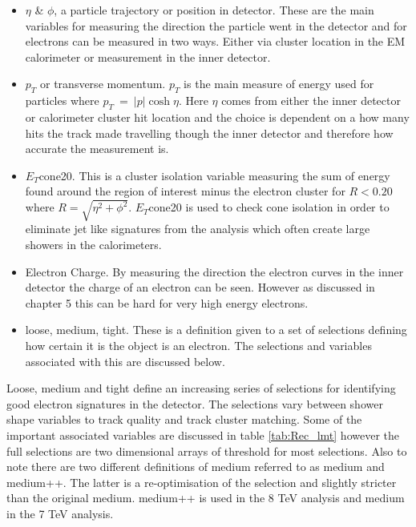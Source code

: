 	\begin{itemize}
	\item $\eta$ \& $\phi$, a particle trajectory or position in detector. These are the main variables for measuring the direction the particle went in the detector and for electrons can be measured in two ways. Either via cluster location in the EM calorimeter or measurement in the inner detector.
	\item $p_{T}$ or transverse momentum. $p_{T}$ is the main measure of energy used for particles where $p_{T}~=~|p|\cosh{\eta}$. Here $\eta$ comes from either the inner detector or calorimeter cluster hit location and the choice is dependent on a how many hits the track made travelling though the inner detector and therefore how accurate the measurement is.
	\item $E_{T}$cone20. This is a cluster isolation variable measuring the sum of energy found around the region of interest minus the electron cluster for $R < 0.20$ where $R = \sqrt{\eta^{2} + \phi^{2}}$. $E_{T}$cone20 is used to check cone isolation in order to eliminate jet like signatures from the analysis which often create large showers in the calorimeters.
	\item Electron Charge. By measuring the direction the electron curves in the inner detector the charge of an electron can be seen. However as discussed in chapter 5 this can be hard for very high energy electrons.
	\item loose, medium, tight. These is a definition given to a set of selections defining how certain it is the object is an electron. The selections and variables associated with this are discussed below.
	\end{itemize}

	Loose, medium and tight define an increasing series of selections for identifying good electron signatures in the detector. The selections vary between shower shape variables to track quality and track cluster matching. Some of the important associated variables are discussed in table \ref{tab:Rec_lmt} however the full selections are two dimensional arrays of threshold for most selections. Also to note there are two different definitions of medium referred to as medium and medium++. The latter is a re-optimisation of the selection and slightly stricter than the original medium. medium++ is used in the 8 TeV analysis and medium in the 7 TeV analysis.

